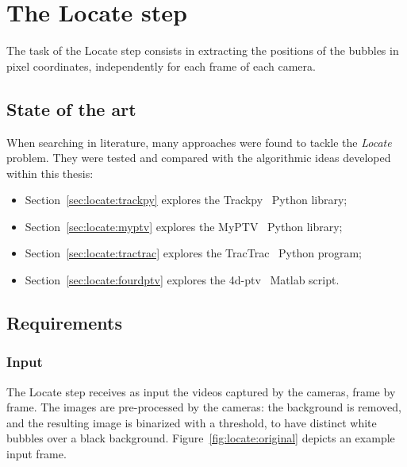 \chapter{The Locate step}
\label{chap:locate}

\newcommand{\locateimgsize}{0.9\textwidth}

The task of the Locate step consists in extracting the positions of the bubbles in pixel coordinates, independently for each frame of each camera.

\section{State of the art}

When searching in literature, many approaches were found to tackle the \textit{Locate} problem.
They were tested and compared with the algorithmic ideas developed within this thesis:
\begin{itemize}
	\itemsep 0em
	\item Section~\ref{sec:locate:trackpy} explores the Trackpy~\cite{trackpy} Python library;
	\item Section~\ref{sec:locate:myptv} explores the MyPTV~\cite{myptv} Python library;
	\item Section~\ref{sec:locate:tractrac} explores the TracTrac~\cite{tractrac} Python program;
	\item Section~\ref{sec:locate:fourdptv} explores the 4d-ptv~\cite{fourdptv} Matlab script.
\end{itemize}

\section{Requirements}

\subsection{Input}
The Locate step receives as input the videos captured by the cameras, frame by frame.
The images are pre-processed by the cameras: the background is removed, and the resulting image is binarized with a threshold, to have distinct white bubbles over a black background.
Figure~\ref{fig:locate:original} depicts an example input frame.

